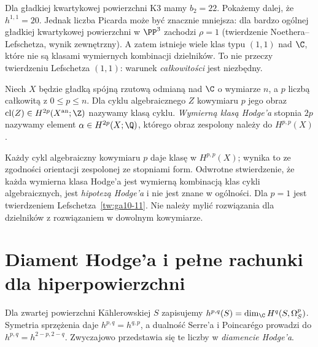 \begin{przyklad}
Dla gładkiej kwartykowej powierzchni K3 mamy
$b_2=22$. Pokażemy dalej, że $h^{1,1}=20$.
Jednak liczba Picarda może być znacznie mniejsza:
dla bardzo ogólnej gładkiej kwartykowej powierzchni
w $\PP^3$ zachodzi $\rho=1$ (twierdzenie
Noethera--Lefschetza, wynik zewnętrzny).
A zatem istnieje wiele klas typu $(1,1)$ nad $\C$,
które nie są klasami wymiernych kombinacji dzielników.
To nie przeczy twierdzeniu Lefschetza $(1,1)$:
warunek \emph{całkowitości} jest niezbędny.
\end{przyklad}

\begin{definicja}
Niech $X$ będzie gładką spójną rzutową odmianą nad $\C$
o wymiarze $n$, a $p$ liczbą całkowitą z $0\le p\le n$.
Dla cyklu algebraicznego $Z$ kowymiaru $p$ jego obraz
$\operatorname{cl}(Z)\in H^{2p}(X^{\rm an};\Z)$
nazywamy klasą cyklu. \emph{Wymierną klasą Hodge'a}
stopnia $2p$ nazywamy element
$\alpha\in H^{2p}(X;\Q)$, którego obraz zespolony
należy do $H^{p,p}(X)$.
\end{definicja}

\begin{uwaga}
Każdy cykl algebraiczny kowymiaru $p$ daje klasę
w $H^{p,p}(X)$; wynika to ze zgodności orientacji
zespolonej ze stopniami form. Odwrotne stwierdzenie,
że każda wymierna klasa Hodge'a jest wymierną kombinacją
klas cykli algebraicznych, jest \emph{hipotezą Hodge'a}
i nie jest znane w ogólności. Dla $p=1$ jest twierdzeniem
Lefschetza~\ref{tw:ga10-11}. Nie należy mylić
rozwiązania dla dzielników z rozwiązaniem
w dowolnym kowymiarze.
\end{uwaga}

\section{Diament Hodge'a i pełne rachunki dla hiperpowierzchni}
\label{sec:ga10-hodge-numbers}

Dla zwartej powierzchni Kählerowskiej $S$ zapisujemy
$h^{p,q}(S)=\dim_{\C}H^q(S,\Omega^p_S)$.
Symetria sprzężenia daje $h^{p,q}=h^{q,p}$,
a dualność Serre'a i Poincarégo prowadzi do
$h^{p,q}=h^{2-p,2-q}$. Zwyczajowo przedstawia się te
liczby w \emph{diamencie Hodge'a}.

